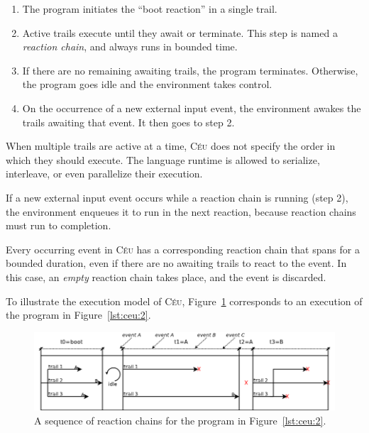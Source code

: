 \documentclass[11pt,a4paper]{article}
\newcommand{\2}{\;\;}
\newcommand{\5}{\;\;\;\;\;}
\newcommand{\CEU}{\textsc{C\'{e}u}}
\begin{document}
\begin{enumerate}
\setlength{\itemsep}{0pt}
\item The program initiates the ``boot reaction'' in a single trail.
\item Active trails execute until they await or terminate.
      This step is named a \emph{reaction chain}, and always runs in bounded 
      time.
\item If there are no remaining awaiting trails, the program terminates.
      Otherwise, the program goes idle and the environment takes control.
\item On the occurrence of a new external input event, the environment awakes 
      the trails awaiting that event.
      It then goes to step 2.
\end{enumerate}

When multiple trails are active at a time, \CEU{} does not specify the order in 
which they should execute.
The language runtime is allowed to serialize, interleave, or even parallelize 
their execution.

If a new external input event occurs while a reaction chain is running (step 
2), the environment enqueues it to run in the next reaction, because reaction 
chains must run to completion.

Every occurring event in \CEU{} has a corresponding reaction chain that spans 
for a bounded duration, even if there are no awaiting trails to react to the 
event.
In this case, an \emph{empty} reaction chain takes place, and the event is 
discarded.

To illustrate the execution model of \CEU{}, Figure~\ref{fig:reaction} 
corresponds to an execution of the program in Figure~\ref{lst:ceu:2}.

\begin{figure}[h]
\centering
\includegraphics[scale=0.50]{reaction.png}
\caption{ A sequence of reaction chains for the program in 
Figure~\ref{lst:ceu:2}.
\label{fig:reaction}
}
\end{figure}
\end{document}

